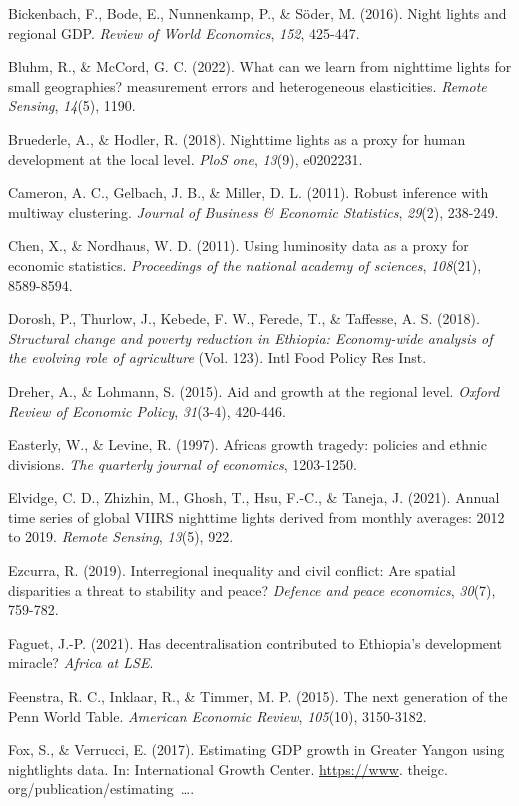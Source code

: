 Bickenbach, F., Bode, E., Nunnenkamp, P., \& Söder, M. (2016). Night
lights and regional GDP. \emph{Review of World Economics}, \emph{152},
425-447.

Bluhm, R., \& McCord, G. C. (2022). What can we learn from nighttime
lights for small geographies? measurement errors and heterogeneous
elasticities. \emph{Remote Sensing}, \emph{14}(5), 1190.

Bruederle, A., \& Hodler, R. (2018). Nighttime lights as a proxy for
human development at the local level. \emph{PloS one}, \emph{13}(9),
e0202231.

Cameron, A. C., Gelbach, J. B., \& Miller, D. L. (2011). Robust
inference with multiway clustering. \emph{Journal of Business \&
Economic Statistics}, \emph{29}(2), 238-249.

Chen, X., \& Nordhaus, W. D. (2011). Using luminosity data as a proxy
for economic statistics. \emph{Proceedings of the national academy of
sciences}, \emph{108}(21), 8589-8594.

Dorosh, P., Thurlow, J., Kebede, F. W., Ferede, T., \& Taffesse, A. S.
(2018). \emph{Structural change and poverty reduction in Ethiopia:
Economy-wide analysis of the evolving role of agriculture} (Vol. 123).
Intl Food Policy Res Inst.

Dreher, A., \& Lohmann, S. (2015). Aid and growth at the regional level.
\emph{Oxford Review of Economic Policy}, \emph{31}(3-4), 420-446.

Easterly, W., \& Levine, R. (1997). Africa\textquotesingle s growth
tragedy: policies and ethnic divisions. \emph{The quarterly journal of
economics}, 1203-1250.

Elvidge, C. D., Zhizhin, M., Ghosh, T., Hsu, F.-C., \& Taneja, J.
(2021). Annual time series of global VIIRS nighttime lights derived from
monthly averages: 2012 to 2019. \emph{Remote Sensing}, \emph{13}(5),
922.

Ezcurra, R. (2019). Interregional inequality and civil conflict: Are
spatial disparities a threat to stability and peace? \emph{Defence and
peace economics}, \emph{30}(7), 759-782.

Faguet, J.-P. (2021). Has decentralisation contributed to Ethiopia's
development miracle? \emph{Africa at LSE}.

Feenstra, R. C., Inklaar, R., \& Timmer, M. P. (2015). The next
generation of the Penn World Table. \emph{American Economic Review},
\emph{105}(10), 3150-3182.

Fox, S., \& Verrucci, E. (2017). Estimating GDP growth in Greater Yangon
using nightlights data. In: International Growth Center.
\url{https://www}. theigc. org/publication/estimating~\ldots.

